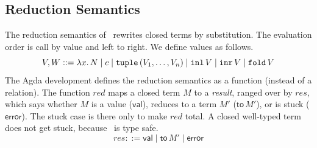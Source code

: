 \subsection{Reduction Semantics}
\label{app:reduction}

The reduction semantics of \fpc\ rewrites closed terms by substitution. The
evaluation order is call by value and left to right. We define values as
follows.
\[
  V, W ::= \lambda x.\,N \mid c \mid \mathtt{tuple}\,(V_1, \ldots, V_n) \mid \mathtt{inl}\,V
    \mid \mathtt{inr}\,V \mid \mathtt{fold}\,V
\]
The Agda development defines the reduction semantics as a function
(instead of a relation).
The function $\mathit{red}$ maps a closed term $M$ to a \emph{result}, ranged
over by $\mathit{res}$, which says whether $M$ is a value ($\mathsf{val}$), reduces to a
term $M'$ ($\mathsf{to}\,M'$), or is stuck ($\mathsf{error}$). The stuck case is
there only to make $\mathit{red}$ total. A closed well-typed term does not get
stuck, because \fpc\ is type safe.
\[
  \mathit{res} ::= \mathsf{val} \mid \mathsf{to}\,M' \mid \mathsf{error}
\]

